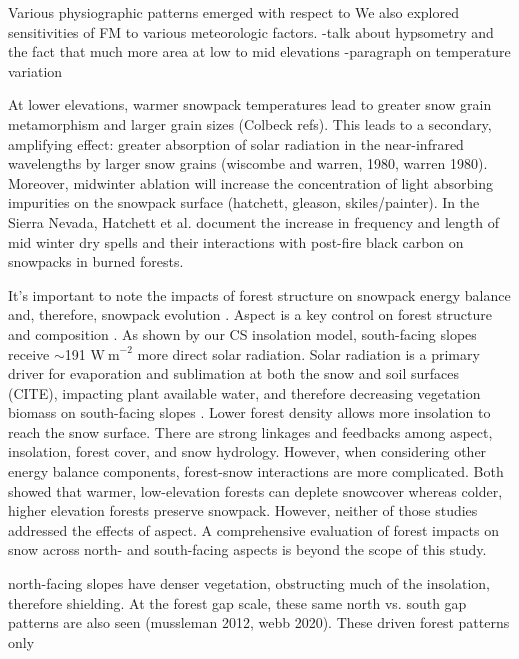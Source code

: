 Various physiographic patterns emerged with respect to 
We also explored sensitivities of FM to various meteorologic factors.
-talk about hypsometry and the fact that much more area at low to mid elevations
-paragraph on temperature variation 


At lower elevations, warmer snowpack temperatures lead to greater snow grain metamorphism and larger grain sizes (Colbeck refs). This leads to a secondary, amplifying effect: greater absorption of solar radiation in the near-infrared wavelengths by larger snow grains (wiscombe and warren, 1980, warren 1980). Moreover, midwinter ablation will increase the concentration of light absorbing impurities on the snowpack surface (hatchett, gleason, skiles/painter). In the Sierra Nevada, Hatchett et al. document the increase in frequency and length of mid winter dry spells and their interactions with post-fire black carbon on snowpacks in burned forests. 

It's important to note the impacts of forest structure on snowpack energy balance and, therefore, snowpack evolution \citep{rothForestImpactsSnow2017}. Aspect is a key control on forest structure and composition \citep{pelletierWhichWayYou2018a}.  As shown by our CS insolation model, south-facing slopes receive $\sim$191 $\mathrm{W~m}^{-2}$ more direct solar radiation. Solar radiation is a primary driver for evaporation and sublimation at both the snow and soil surfaces (CITE), impacting plant available water, and therefore decreasing vegetation biomass on south-facing slopes \citep{zapata-riosInfluenceTerrainAspect2016}. Lower forest density allows more insolation to reach the snow surface. There are strong linkages and feedbacks among aspect, insolation, forest cover, and snow hydrology. However, when considering other energy balance components, forest-snow interactions are more complicated.  Both \citep{lundquistLowerForestDensity2013,rothForestImpactsSnow2017} showed that warmer, low-elevation forests can deplete snowcover whereas colder, higher elevation forests preserve snowpack. However, neither of those studies addressed the effects of aspect. A comprehensive evaluation of forest impacts on snow across north- and south-facing aspects is beyond the scope of this study.


north-facing slopes have denser vegetation, obstructing much of the insolation, therefore shielding. At the forest gap scale, these same north vs. south gap patterns are also seen (mussleman 2012, webb 2020). These driven forest patterns only 


